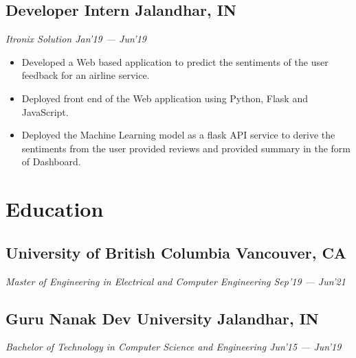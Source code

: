 \documentclass[a4paper,11pt]{article}
\begin{document}
\subsection{Developer Intern          \hspace{29em}                                   Jalandhar, IN}
\emph{Itronix Solution \hspace {33em} Jan'19 --- Jun'19}
\begin{itemize}
    \item Developed a Web based application to predict the sentiments of the user feedback for an airline service.
    \item Deployed front end of the Web application using Python, Flask and JavaScript.
    \item Deployed the Machine Learning model as a flask API service to derive the sentiments from the user provided reviews and provided summary in the form of Dashboard. 
\end{itemize}

\section{Education}
\subsection{University of British Columbia \hspace{23em}                   Vancouver, CA}
\emph{Master of Engineering in Electrical and Computer Engineering \hspace{13.3em}         Sep'19 --- Jun'21}
\vspace{0.1em}
\subsection{Guru Nanak Dev University   \hspace{24.2em}                        Jalandhar, IN}    
\emph{Bachelor of Technology in Computer Science and Engineering \hspace{13.7em}          Jun'15 ---  Jun'19}

\end{document}
